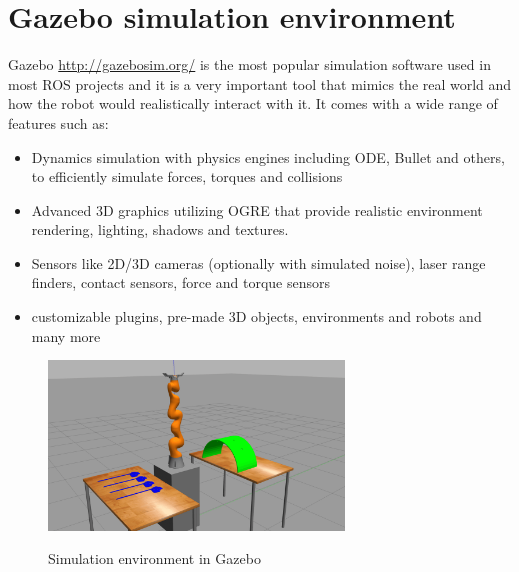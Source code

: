 \section{Gazebo simulation environment}

Gazebo \url{http://gazebosim.org/} is the most popular simulation software used in most ROS projects and it is a very important tool that mimics the real world and how the robot would realistically interact with it. It comes with a wide range of 
features such as:
\begin{itemize}
	\item Dynamics simulation with physics engines including ODE, Bullet and others, to efficiently simulate forces, torques and collisions
	\item Advanced 3D graphics utilizing OGRE that provide realistic environment rendering, lighting, shadows and textures.
	\item Sensors like 2D/3D cameras (optionally with simulated noise), laser range finders, contact sensors, force and torque sensors
	\item customizable plugins, pre-made 3D objects, environments and robots and many more
\end{itemize}

\begin{center}
\begin{figure}[!htb]
\centering
\includegraphics[width=0.7\textwidth]{images/gazebo-sim1.png}\\
\caption{Simulation environment in Gazebo}
\end{figure}
\end{center}

